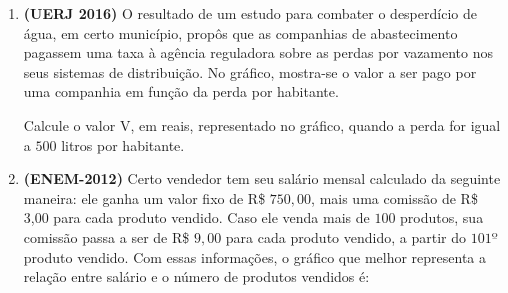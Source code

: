 \begin{enumerate}
\item \textbf{(UERJ 2016)} O resultado de um estudo para combater o desperdício de água, em certo município, propôs que as companhias de abastecimento pagassem uma taxa à agência reguladora sobre as perdas por vazamento nos seus sistemas de distribuição. No gráfico, mostra-se o valor a ser pago por uma companhia em função da perda por habitante.
\begin{figure}[H]
\centering

\end{figure}
Calcule o valor V, em reais, representado no gráfico, quando a perda for igual a \(500\) litros por habitante.

\item \textbf{(ENEM-2012)} Certo vendedor tem seu salário mensal calculado da seguinte maneira: ele ganha um valor fixo de R\$ \(750,00\), mais uma comissão de R\$ 3,00 para cada produto vendido. Caso ele venda mais de \(100\) produtos, sua comissão passa a ser de R\$ \(9,00\) para cada produto vendido, a partir do \(101º\) produto vendido. Com essas informações, o gráfico que melhor representa a relação entre salário e o número de produtos vendidos é:
\begin{figure}[H]
\centering


\end{figure}
\end{enumerate}
